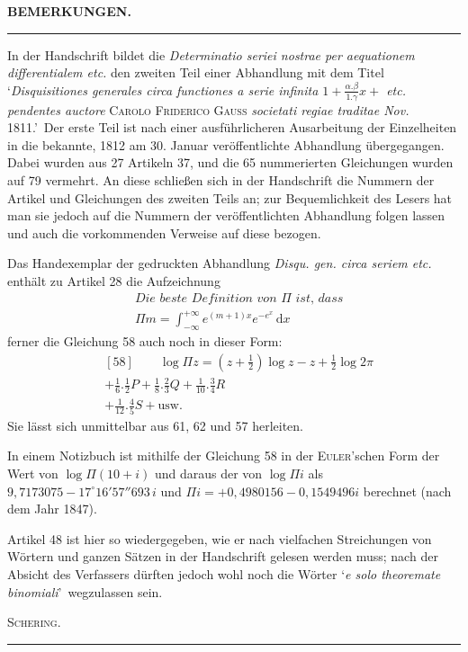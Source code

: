 \clearpage{}
\begin{center}\textbf{BEMERKUNGEN.}\par\smallskip\rule{.15\linewidth}{.4pt}\end{center}
In der Handschrift bildet die \textit{Determinatio seriei nostrae per aequationem differentialem etc.} den zweiten Teil einer Abhandlung mit dem Titel \lq\textit{Disquisitiones generales circa functiones a serie infinita $1+\frac{\alpha.\beta}{1.\gamma}x+$ etc. pendentes auctore} \textsc{Carolo Friderico Gauss} \textit{societati regiae traditae Nov.} 1811.\rq\ Der erste Teil ist nach einer ausführlicheren Ausarbeitung der Einzelheiten in die bekannte, 1812 am 30. Januar veröffentlichte Abhandlung übergegangen. Dabei wurden aus 27 Artikeln 37, und die 65 nummerierten Gleichungen wurden auf 79 vermehrt. An diese schließen sich in der Handschrift die Nummern der Artikel und Gleichungen des zweiten Teils an; zur Bequemlichkeit des Lesers hat man sie jedoch auf die Nummern der veröffentlichten Abhandlung folgen lassen und auch die vorkommenden Verweise auf diese bezogen.

Das Handexemplar der gedruckten Abhandlung \textit{Disqu. gen. circa seriem etc.} enthält zu Artikel 28 die Aufzeichnung
\[
\begin{aligned}&\textit{Die beste Definition von }\Pi\textit{ ist, dass}\\&
\Pi m=\int_{-\infty}^{+\infty}e^{(m+1)x}e^{-e^x}\,\mathrm dx\end{aligned}
\]
ferner die Gleichung 58 auch noch in dieser Form:
\[
\begin{aligned}&[58]\qquad \log\Pi z=(z+\tfrac12)\log z-z+\tfrac12\log2\pi\\&+\tfrac16.\tfrac12 P+\tfrac18.\tfrac23 Q+\tfrac1{10}.\tfrac34 R\\&+\tfrac1{12}.\tfrac45 S+\text{usw.}\end{aligned}
\]
Sie lässt sich unmittelbar aus 61, 62 und 57 herleiten.

In einem Notizbuch ist mithilfe der Gleichung 58 in der \textsc{Euler}'schen Form der Wert von $\log\Pi(10+i)$ und daraus der von $\log\Pi i$ als
$9{,}7173075-17^\circ16'57''693\,i$ und
$\Pi i=+0{,}4980156-0{,}1549496i$ berechnet (nach dem Jahr 1847).

Artikel 48 ist hier so wiedergegeben, wie er nach vielfachen Streichungen von Wörtern und ganzen Sätzen in der Handschrift gelesen werden muss; nach der Absicht des Verfassers dürften jedoch wohl noch die Wörter \lq\textit{e solo theoremate binomiali}\rq\ wegzulassen sein.
\begin{flushright}\textsc{Schering.}\end{flushright}
\begin{center}\rule{.4\linewidth}{.4pt}\end{center}
